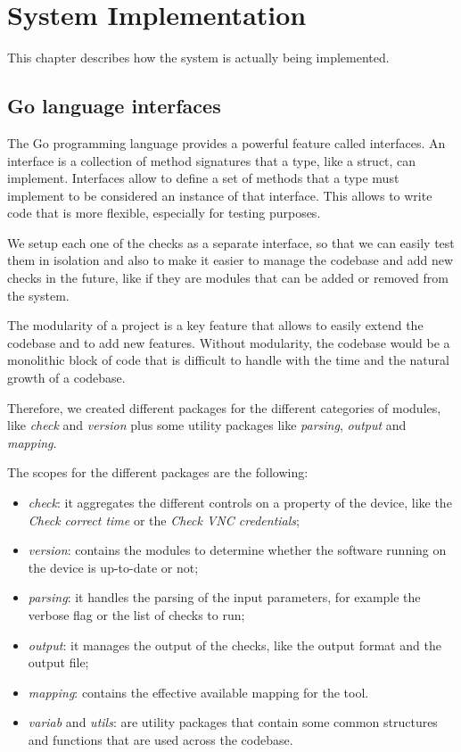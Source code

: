 \chapter{System Implementation}

This chapter describes how the system is actually being implemented.

\section{Go language interfaces}

The Go programming language provides a powerful feature called interfaces. An interface is a collection of method signatures that a type, like a struct, can implement. Interfaces allow to define a set of methods that a type must implement to be considered an instance of that interface. This allows to write code that is more flexible, especially for testing purposes.

We setup each one of the checks as a separate interface, so that we can easily test them in isolation and also to make it easier to manage the codebase and add new checks in the future, like if they are modules that can be added or removed from the system.

The modularity of a project is a key feature that allows to easily extend the codebase and to add new features. Without modularity, the codebase would be a monolithic block of code that is difficult to handle with the time and the natural growth of a codebase.

Therefore, we created different packages for the different categories of modules, like \textit{check} and \textit{version} plus some utility packages like \textit{parsing}, \textit{output} and \textit{mapping}.

The scopes for the different packages are the following:

\begin{itemize}
  \item \textit{check}: it aggregates the different controls on a property of the device, like the \textit{Check correct time} or the \textit{Check VNC credentials};
  \item \textit{version}: contains the modules to determine whether the software running on the device is up-to-date or not;
  \item \textit{parsing}: it handles the parsing of the input parameters, for example the verbose flag or the list of checks to run;
  \item \textit{output}: it manages the output of the checks, like the output format and the output file;
  \item \textit{mapping}: contains the effective available mapping for the tool.
  \item \textit{variab} and \textit{utils}: are utility packages that contain some common structures and functions that are used across the codebase.
\end{itemize}

